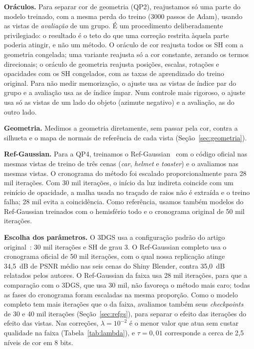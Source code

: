\documentclass[conference]{IEEEtran}
\begin{document}
\textbf{Oráculos.} Para separar cor de geometria (QP2), reajustamos só uma parte do modelo treinado, com a mesma perda do treino (3000 passos de Adam), usando as vistas de \emph{avaliação} de um grupo. É um procedimento deliberadamente privilegiado: o resultado é o teto do que uma correção restrita àquela parte poderia atingir, e não um método. O oráculo de cor reajusta todos os SH com a geometria congelada; uma variante reajusta só a cor constante, zerando os termos direcionais; o oráculo de geometria reajusta posições, escalas, rotações e opacidades com os SH congelados, com as taxas de aprendizado do treino original. Para não medir memorização, o ajuste usa as vistas de índice par do grupo e a avaliação usa as de índice ímpar. Num controle mais rigoroso, o ajuste usa só as vistas de um lado do objeto (azimute negativo) e a avaliação, as do outro lado.

\textbf{Geometria.} Medimos a geometria diretamente, sem passar pela cor, contra a silhueta e o mapa de normais de referência de cada vista (Seção~\ref{sec:geometria}).

\textbf{Ref-Gaussian.} Para a QP4, treinamos o Ref-Gaussian~\cite{yao2025refgaussian} com o código oficial nas mesmas vistas de treino de três cenas (\textit{car}, \textit{helmet} e \textit{toaster}) e o avaliamos nas mesmas vistas. O cronograma do método foi escalado proporcionalmente para 28 mil iterações. Com 30 mil iterações, o início da luz indireta coincide com um reinício de opacidade, a malha usada no traçado de raios não é extraída e o treino falha; 28 mil evita a coincidência. Como referência, usamos também modelos do Ref-Gaussian treinados com o hemisfério todo e o cronograma original de 50 mil iterações.

\textbf{Escolha dos parâmetros.} O 3DGS usa a configuração padrão do artigo original~\cite{kerbl2023}: 30 mil iterações e SH de grau 3. O Ref-Gaussian completo usa o cronograma oficial de 50 mil iterações, com o qual nossa replicação atinge 34,5~dB de PSNR médio nas seis cenas do Shiny Blender, contra 35,0~dB relatados pelos autores. O Ref-Gaussian da faixa usa 28 mil iterações, para que a comparação com o 3DGS, que usa 30 mil, não favoreça o método mais caro; todas as fases do cronograma foram escaladas na mesma proporção. Como o modelo completo tem mais iterações que o da faixa, avaliamos também seus \textit{checkpoints} de 30 e 40 mil iterações (Seção~\ref{sec:refgs}), para separar o efeito das iterações do efeito das vistas. Nas correções, $\lambda = 10^{-2}$ é o menor valor que atua sem custar qualidade na faixa (Tabela~\ref{tab:lambda}), e $\tau = 0{,}01$ corresponde a cerca de 2,5 níveis de cor em 8 bits.
\end{document}
